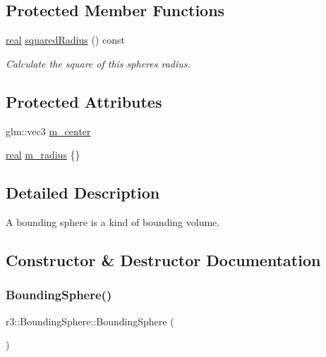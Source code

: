 \subsection*{Protected Member Functions}
\begin{DoxyCompactItemize}
\item 
\mbox{\hyperlink{namespacer3_ab2016b3e3f743fb735afce242f0dc1eb}{real}} \mbox{\hyperlink{classr3_1_1_bounding_sphere_ae0e7a71b8cfe2f3287397ac865545ee4}{squared\+Radius}} () const
\begin{DoxyCompactList}\small\item\em Calculate the square of this spheres radius. \end{DoxyCompactList}\end{DoxyCompactItemize}
\subsection*{Protected Attributes}
\begin{DoxyCompactItemize}
\item 
glm\+::vec3 \mbox{\hyperlink{classr3_1_1_bounding_sphere_a880d9888f25b016c5c38c608e16fa61e}{m\+\_\+center}}
\item 
\mbox{\hyperlink{namespacer3_ab2016b3e3f743fb735afce242f0dc1eb}{real}} \mbox{\hyperlink{classr3_1_1_bounding_sphere_a37ccefd38d8cea7a0d52b85f771ec7c4}{m\+\_\+radius}} \{\}
\end{DoxyCompactItemize}


\subsection{Detailed Description}
A bounding sphere is a kind of bounding volume. 

\subsection{Constructor \& Destructor Documentation}
\mbox{\label{classr3_1_1_bounding_sphere_af602a853d8ed0b5ccad8679ee41fe7f8}} 
\subsubsection{\texorpdfstring{Bounding\+Sphere()}{BoundingSphere()}\hspace{0.1cm}{\footnotesize\ttfamily [1/3]}}
{\footnotesize\ttfamily r3\+::\+Bounding\+Sphere\+::\+Bounding\+Sphere (\begin{DoxyParamCaption}{ }\end{DoxyParamCaption})\hspace{0.3cm}{\ttfamily [default]}}

